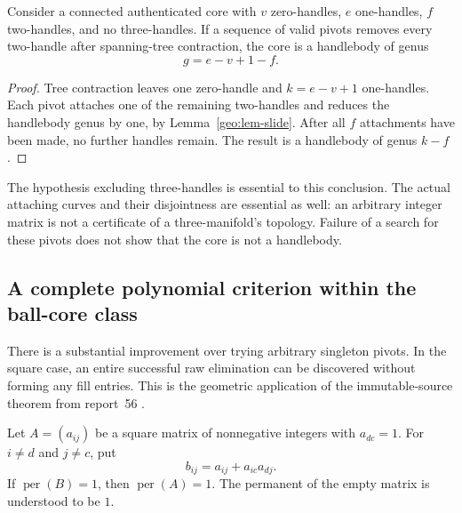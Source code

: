 \begin{corollary}
\label{geo:cor-core-handlebody}
Consider a connected authenticated core with $v$ zero-handles, $e$
one-handles, $f$ two-handles, and no three-handles.  If a sequence of valid
pivots removes every two-handle after spanning-tree contraction, the core
is a handlebody of genus
\[
 g=e-v+1-f.
 \tag{G4}\label{geo:eq-core-genus}
\]
\end{corollary}

\begin{proof}
Tree contraction leaves one zero-handle and $k=e-v+1$ one-handles.
Each pivot attaches one of the remaining two-handles and reduces the
handlebody genus by one, by Lemma~\ref{geo:lem-slide}.  After all $f$
attachments have been made, no further handles remain.  The result is a
handlebody of genus $k-f$.
\end{proof}

The hypothesis excluding three-handles is essential to this conclusion.
The actual attaching curves and their disjointness are essential as well:
an arbitrary integer matrix is not a certificate of a three-manifold's
topology.  Failure of a search for these pivots does not show that the core
is not a handlebody.

\subsection{A complete polynomial criterion within the ball-core class}
\label{geo:ball-closure}

There is a substantial improvement over trying arbitrary singleton
pivots.  In the square case, an entire successful raw elimination can be
discovered without forming any fill entries.  This is the geometric
application of the immutable-source theorem from report~56
\cite{ProveIt2026}.

\begin{lemma}
\label{geo:lem-permanent-pivot}
Let $A=(a_{ij})$ be a square matrix of nonnegative integers with $a_{dc}=1$.
For $i\ne d$ and $j\ne c$, put
\[
 b_{ij}=a_{ij}+a_{ic}a_{dj}.
\]
If $\operatorname{per}(B)=1$, then $\operatorname{per}(A)=1$.
The permanent of the empty matrix is understood to be $1$.
\end{lemma}

